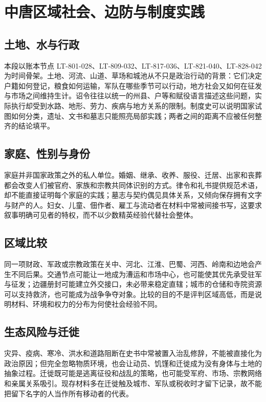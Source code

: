 \section{中唐区域社会、边防与制度实践}
\label{sec:middle-tang-regional-frontier-society}

\subsection{土地、水与行政}
本段以账本节点 LT-801-028、LT-809-032、LT-817-036、LT-821-040、LT-828-042 为时间骨架。土地、河流、山道、草场和城池从不只是政治行动的背景：它们决定户籍如何登记，粮食如何运输，军队在哪些季节可以行动，地方社会又如何在征发与市场之间维持生计。诏令往往以统一的州县、户等和赋役语言描述这些问题，实际执行却受到水路、地形、劳力、疾病与地方关系的限制。制度史可以说明国家试图如何分类，遗址、文书和墓志只能照亮局部实践；两者之间的距离不应被任何整齐的结论填平。

\subsection{家庭、性别与身份}
家庭并非国家政策之外的私人单位。婚姻、继承、收养、服役、迁居、出家和丧葬都会改变人们被官府、家族和宗教共同体识别的方式。律令和礼书提供规范术语，却不能直接证明每个家庭的实践；墓志与契约偶见具体关系，又倾向保存拥有文字与财产的人。妇女、儿童、佃作者、雇工与流动者在材料中常被间接书写，这要求叙事明确可见者的特权，而不以少数精英经验代替社会整体。

\subsection{区域比较}
同一项财政、军政或宗教政策在关中、河北、江淮、巴蜀、河西、岭南和边地会产生不同后果。交通节点可能让一地成为漕运和市场中心，也可能使其优先承受驻军与征发；边疆册封可能建立外交接口，未必带来稳定直辖；城市的仓储和寺院资源可以支持救济，也可能成为战争争夺对象。比较的目的不是评判区域高低，而是说明材料、环境和权力的分布为何使社会经验不同。

\subsection{生态风险与迁徙}
灾异、疫病、寒冷、洪水和道路阻断在史书中常被置入治乱修辞，不能被直接化为政治原因；但完全忽略物质环境，也会让动员、饥馑和迁徙成为没有身体与土地的抽象过程。迁徙既可能是逃离征役和战乱的策略，也可能受军府、市场、宗教网络和亲属关系吸引。现存材料多在迁徙触及城市、军队或税收时才留下记录，故不能把留下名字的人当作所有移动者的代表。

